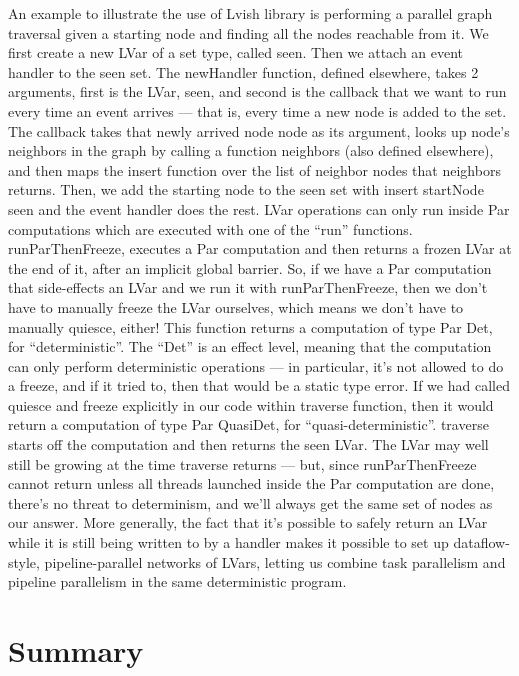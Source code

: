 \documentclass[twocolumn]{article}
\begin{document}
An example to illustrate the use of Lvish library is performing a parallel graph traversal given a starting node and finding all the nodes reachable from it. We first create a new LVar of a set type, called seen. Then we attach an event handler to the seen set. The newHandler function, defined elsewhere, takes 2 arguments, first is the LVar, seen, and second is the callback that we want to run every time an event arrives — that is, every time a new node is added to the set. The callback takes that newly arrived node node as its argument, looks up node’s neighbors in the graph by calling a function neighbors (also defined elsewhere), and then maps the insert function over the list of neighbor nodes that neighbors returns. Then, we add the starting node to the seen set with insert startNode seen and the event handler does the rest.
LVar operations can only run inside Par computations which are executed with one of the “run” functions.  runParThenFreeze, executes a Par computation and then returns a frozen LVar at the end of it, after an implicit global barrier. So, if we have a Par computation that side-effects an LVar and we run it with runParThenFreeze, then we don’t have to manually freeze the LVar ourselves, which means we don’t have to manually quiesce, either! 
This function returns a computation of type Par Det, for “deterministic”. The “Det” is an effect level, meaning that the computation can only perform deterministic operations — in particular, it’s not allowed to do a freeze, and if it tried to, then that would be a static type error. If we had called quiesce and freeze explicitly in our code within traverse function, then it would return a computation of type Par QuasiDet, for “quasi-deterministic”. 
traverse starts off the computation and then returns the seen LVar. The LVar may well still be growing at the time traverse returns — but, since runParThenFreeze cannot return unless all threads launched inside the Par computation are done, there’s no threat to determinism, and we’ll always get the same set of nodes as our answer. More generally, the fact that it’s possible to safely return an LVar while it is still being written to by a handler makes it possible to set up dataflow-style, pipeline-parallel networks of LVars, letting us combine task parallelism and pipeline parallelism in the same deterministic program.  

\section{Summary}
\label{summary}
\end{document}
